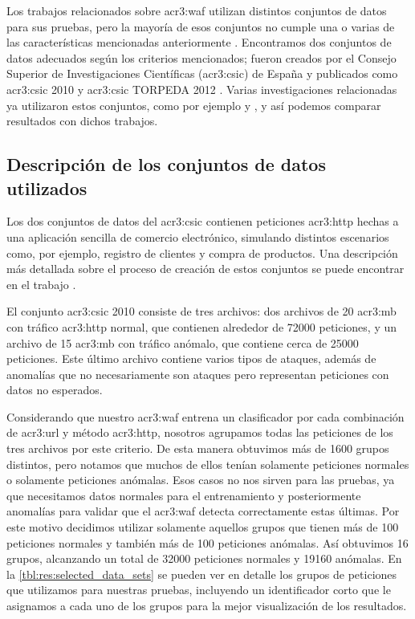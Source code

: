 Los trabajos relacionados sobre \gls{acr3:waf} utilizan distintos conjuntos
de datos para sus pruebas, pero la mayoría de esos conjuntos no cumple una
o varias de las características mencionadas anteriormente
\citep{torranoGimenez2015study}.
Encontramos dos conjuntos de datos adecuados según los criterios mencionados;
fueron creados por el Consejo Superior de Investigaciones Científicas
(\gls{acr3:csic}) de España y publicados como \gls{acr3:csic} 2010
\citep{csic2010dataset} y \gls{acr3:csic} TORPEDA 2012 \citep{torpeda2012dataset}.
Varias investigaciones relacionadas ya utilizaron estos conjuntos, como
por ejemplo \citep{parhizkar2015oc} y \citep{torranoGimenez2015study},
y así podemos comparar resultados con dichos trabajos.


\subsection{Descripción de los conjuntos de datos utilizados}

Los dos conjuntos de datos del \gls{acr3:csic} contienen peticiones
\gls{acr3:http} hechas a una aplicación sencilla de comercio electrónico,
simulando distintos escenarios como, por ejemplo, registro de clientes
y compra de productos. Una descripción más detallada sobre el proceso
de creación de estos conjuntos se puede encontrar en el trabajo
\citep{torranoGimenez2015study}.

El conjunto \gls{acr3:csic} 2010 \citep{csic2010dataset} consiste de tres
archivos: dos archivos de 20 \gls{acr3:mb} con tráfico \gls{acr3:http}
normal, que contienen alrededor de \num{72000} peticiones, y un archivo
de 15 \gls{acr3:mb} con tráfico anómalo, que contiene cerca de \num{25000}
peticiones. Este último archivo contiene varios tipos de ataques, además
de anomalías que no necesariamente son ataques pero representan peticiones
con datos no esperados.

Considerando que nuestro \gls{acr3:waf} entrena un clasificador por cada
combinación de \gls{acr3:url} y método \gls{acr3:http}, nosotros agrupamos
todas las peticiones de los tres archivos por este criterio.
De esta manera obtuvimos más de \num{1600} grupos distintos, pero notamos
que muchos de ellos tenían solamente peticiones normales o solamente
peticiones anómalas. Esos casos no nos sirven para las pruebas, ya que
necesitamos datos normales para el entrenamiento y posteriormente anomalías
para validar que el \gls{acr3:waf} detecta correctamente estas últimas.
Por este motivo decidimos utilizar solamente aquellos grupos que tienen
más de 100 peticiones normales y también más de 100 peticiones anómalas.
Así obtuvimos 16 grupos, alcanzando un total de \num{32000} peticiones
normales y \num{19160} anómalas.
En la \autoref{tbl:res:selected_data_sets} se pueden ver en detalle los grupos
de peticiones que utilizamos para nuestras pruebas, incluyendo un identificador
corto que le asignamos a cada uno de los grupos para la mejor visualización
de los resultados.

